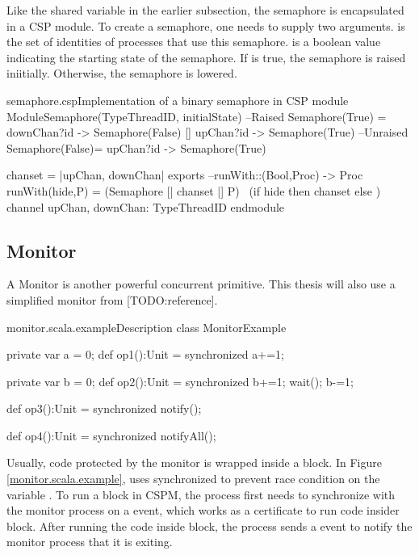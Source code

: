 \documentclass{article}
\begin{document}
Like the shared variable in the earlier subsection, the semaphore is encapsulated in a CSP module. To create a semaphore, one needs to supply two arguments.  is the set of identities of processes that use this semaphore.  is a boolean value indicating the starting state of the semaphore. If  is true, the semaphore is raised iniitially. Otherwise, the semaphore is lowered. 
\begin{cspinline}{semaphore.csp}{Implementation of a binary semaphore in CSP}
module ModuleSemaphore(TypeThreadID, initialState)
  --Raised
  Semaphore(True) = downChan?id -> Semaphore(False)
                   [] upChan?id -> Semaphore(True)
  --Unraised
  Semaphore(False)= upChan?id   -> Semaphore(True)
  
  chanset = {|upChan, downChan|}
exports
  --runWith::(Bool,Proc) -> Proc
  runWith(hide,P) = (Semaphore [| chanset |] P) \ 
                     (if hide then chanset else {})
  channel upChan, downChan: TypeThreadID
endmodule
\end{cspinline}

\subsection{Monitor}
A Monitor is another powerful concurrent primitive. This thesis will also use a simplified monitor from [TODO:reference].

\begin{scalainline}{monitor.scala.example}{Description}
class MonitorExample {
  private var a = 0;
  def op1():Unit = synchronized{
    a+=1;
  }

  private var b = 0;
  def op2():Unit = synchronized{
    b+=1;
    wait();
    b-=1;
  }

  def op3():Unit = synchronized{
    notify();
  }

  def op4():Unit = synchronized{
    notifyAll();
  }
}
\end{scalainline}

Usually, code protected by the monitor is wrapped inside a  block. In Figure \ref{monitor.scala.example},  uses synchronized to prevent race condition on the variable . To run a  block in CSPM, the process first needs to synchronize with the monitor process on a  event, which works as a certificate to run code insider block. After running the code inside  block, the process sends a  event to notify the monitor process that it is exiting.
\end{document}
